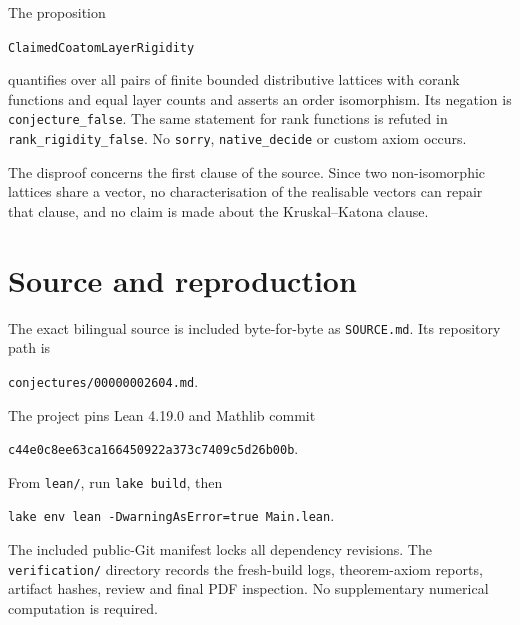 \documentclass[11pt]{article}
\theoremstyle{remark}
\begin{document}
The proposition
\begin{center}\small\texttt{ClaimedCoatomLayerRigidity}\end{center}
quantifies over all pairs of finite bounded distributive lattices with
corank functions and equal layer counts and asserts an order
isomorphism. Its negation is \texttt{conjecture\_false}. The same
statement for rank functions is refuted in
\texttt{rank\_rigidity\_false}. No \texttt{sorry},
\texttt{native\_decide} or custom axiom occurs.

The disproof concerns the first clause of the source. Since two
non-isomorphic lattices share a vector, no characterisation of the
realisable vectors can repair that clause, and no claim is made about
the Kruskal--Katona clause.

\section*{Source and reproduction}
The exact bilingual source is included byte-for-byte as
\texttt{SOURCE.md}. Its repository path is
\begin{center}\small\texttt{conjectures/00000002604.md}.\end{center}
The project pins Lean 4.19.0 and Mathlib commit
\begin{center}\small\texttt{c44e0c8ee63ca166450922a373c7409c5d26b00b}.\end{center}
From \texttt{lean/}, run \texttt{lake build}, then
\begin{center}\small\texttt{lake env lean -DwarningAsError=true Main.lean}.\end{center}
The included public-Git manifest locks all dependency revisions. The
\texttt{verification/} directory records the fresh-build logs,
theorem-axiom reports, artifact hashes, review and final PDF
inspection. No supplementary numerical computation is required.
\end{document}
